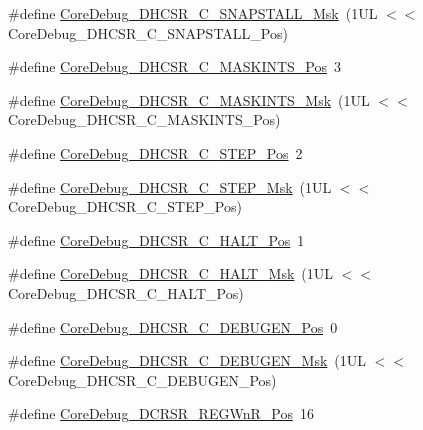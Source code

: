 \begin{DoxyCompactItemize}
\item 
\#define \mbox{\hyperlink{group___c_m_s_i_s___core_debug_ga53aa99b2e39a67622f3b9973e079c2b4}{Core\+Debug\+\_\+\+D\+H\+C\+S\+R\+\_\+\+C\+\_\+\+S\+N\+A\+P\+S\+T\+A\+L\+L\+\_\+\+Msk}}~(1\+U\+L $<$$<$ Core\+Debug\+\_\+\+D\+H\+C\+S\+R\+\_\+\+C\+\_\+\+S\+N\+A\+P\+S\+T\+A\+L\+L\+\_\+\+Pos)
\item 
\#define \mbox{\hyperlink{group___c_m_s_i_s___core_debug_ga0d2907400eb948a4ea3886ca083ec8e3}{Core\+Debug\+\_\+\+D\+H\+C\+S\+R\+\_\+\+C\+\_\+\+M\+A\+S\+K\+I\+N\+T\+S\+\_\+\+Pos}}~3
\item 
\#define \mbox{\hyperlink{group___c_m_s_i_s___core_debug_ga77fe1ef3c4a729c1c82fb62a94a51c31}{Core\+Debug\+\_\+\+D\+H\+C\+S\+R\+\_\+\+C\+\_\+\+M\+A\+S\+K\+I\+N\+T\+S\+\_\+\+Msk}}~(1\+U\+L $<$$<$ Core\+Debug\+\_\+\+D\+H\+C\+S\+R\+\_\+\+C\+\_\+\+M\+A\+S\+K\+I\+N\+T\+S\+\_\+\+Pos)
\item 
\#define \mbox{\hyperlink{group___c_m_s_i_s___core_debug_gae1fc39e80de54c0339cbb1b298a9f0f9}{Core\+Debug\+\_\+\+D\+H\+C\+S\+R\+\_\+\+C\+\_\+\+S\+T\+E\+P\+\_\+\+Pos}}~2
\item 
\#define \mbox{\hyperlink{group___c_m_s_i_s___core_debug_gae6bda72fbd32cc5734ff3542170dc00d}{Core\+Debug\+\_\+\+D\+H\+C\+S\+R\+\_\+\+C\+\_\+\+S\+T\+E\+P\+\_\+\+Msk}}~(1\+U\+L $<$$<$ Core\+Debug\+\_\+\+D\+H\+C\+S\+R\+\_\+\+C\+\_\+\+S\+T\+E\+P\+\_\+\+Pos)
\item 
\#define \mbox{\hyperlink{group___c_m_s_i_s___core_debug_gaddf1d43f8857e4efc3dc4e6b15509692}{Core\+Debug\+\_\+\+D\+H\+C\+S\+R\+\_\+\+C\+\_\+\+H\+A\+L\+T\+\_\+\+Pos}}~1
\item 
\#define \mbox{\hyperlink{group___c_m_s_i_s___core_debug_ga1d905a3aa594eb2e8bb78bcc4da05b3f}{Core\+Debug\+\_\+\+D\+H\+C\+S\+R\+\_\+\+C\+\_\+\+H\+A\+L\+T\+\_\+\+Msk}}~(1\+U\+L $<$$<$ Core\+Debug\+\_\+\+D\+H\+C\+S\+R\+\_\+\+C\+\_\+\+H\+A\+L\+T\+\_\+\+Pos)
\item 
\#define \mbox{\hyperlink{group___c_m_s_i_s___core_debug_gab557abb5b172b74d2cf44efb9d824e4e}{Core\+Debug\+\_\+\+D\+H\+C\+S\+R\+\_\+\+C\+\_\+\+D\+E\+B\+U\+G\+E\+N\+\_\+\+Pos}}~0
\item 
\#define \mbox{\hyperlink{group___c_m_s_i_s___core_debug_gab815c741a4fc2a61988cd2fb7594210b}{Core\+Debug\+\_\+\+D\+H\+C\+S\+R\+\_\+\+C\+\_\+\+D\+E\+B\+U\+G\+E\+N\+\_\+\+Msk}}~(1\+U\+L $<$$<$ Core\+Debug\+\_\+\+D\+H\+C\+S\+R\+\_\+\+C\+\_\+\+D\+E\+B\+U\+G\+E\+N\+\_\+\+Pos)
\item 
\#define \mbox{\hyperlink{group___c_m_s_i_s___core_debug_ga51e75942fc0614bc9bb2c0e96fcdda9a}{Core\+Debug\+\_\+\+D\+C\+R\+S\+R\+\_\+\+R\+E\+G\+Wn\+R\+\_\+\+Pos}}~16
$$
\end{DoxyCompactItemize}

